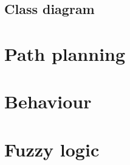 \documentclass[11pt]{extarticle}
\begin{document}
    \subsection[The class diagram of our behaviour system]{Class diagram}
    

    \newpage
    \section{Path planning}\label{sec:pathPlanning}

    \newpage
    \section{Behaviour}\label{sec:behaviour}

    \newpage
    \section{Fuzzy logic}\label{sec:fuzzyLogic}
    

    \newpage
\end{document}
